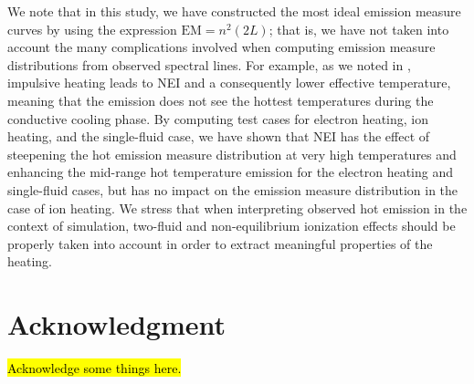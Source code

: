 \documentclass[apj]{emulateapj}
\begin{document}
	\par We note that in this study, we have constructed the most ideal emission measure curves by using the expression $\mathrm{EM}=n^2(2L)$; that is, we have not taken into account the many complications involved when computing emission measure distributions from observed spectral lines. For example, as we noted in , impulsive heating leads to NEI and a consequently lower effective temperature, meaning that the emission does not see the hottest temperatures during the conductive cooling phase. By computing test cases for electron heating, ion heating, and the single-fluid case, we have shown that NEI has the effect of steepening the hot emission measure distribution at very high temperatures and enhancing the mid-range hot temperature emission for the electron heating and single-fluid cases, but has no impact on the emission measure distribution in the case of ion heating. We stress that when interpreting observed hot emission in the context of simulation, two-fluid and non-equilibrium ionization effects should be properly taken into account in order to extract meaningful properties of the heating.
	\section*{Acknowledgment}
	\hl{Acknowledge some things here.} 
	
	
	\clearpage
\end{document}
